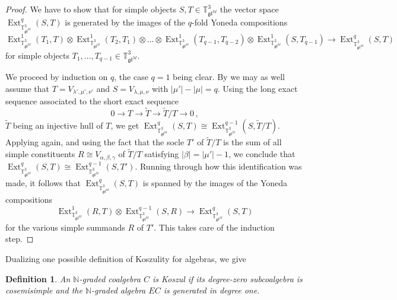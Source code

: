 \documentclass[11pt]{article}
\theoremstyle{plain}
\theoremstyle{nonumberplain}
\theoremstyle{plain}
\newtheorem{definition}[lemma]{Definition}
\theoremstyle{nonumberplain}
\newtheorem{proof}{Proof}
\newcommand\bN{{\mathbb N}}
\newcommand\bT{{\mathbb T}}
\newcommand\fgl{\mathfrak{gl}}
\DeclareMathOperator{\Ext}{\mathrm{Ext}}
\newcommand{\define}[1]{{\em #1}}
\begin{document}
\begin{proof}
We have to show that for simple objects $S,T\in \bT^3_{\fgl^M}$ the
vector space $\Ext_{\bT^3_{\fgl^M}}^q(S,T)$ is generated by the images of the $q$-fold Yoneda
compositions %
\begin{equation*}
	\Ext^1_{\bT^3_{\fgl^M}}\left(T_1,T\right)\otimes \Ext^1_{\bT^3_{\fgl^M}}\left(T_2,T_1\right)\otimes\ldots\otimes \Ext^1_{\bT^3_{\fgl^M}}\left(T_{q-1},T_{q-2}\right) \otimes \Ext^1_{\bT^3_{\fgl^M}}\left(S,T_{q-1}\right) \to \Ext^q_{\bT^3_{\fgl^M}}\left(S,T\right)
\end{equation*}
for simple objects $T_1,\ldots,T_{q-1}\in\bT^3_{\fgl^M}$.

We proceed by induction on $q$, the
case $q=1$ being clear.  By  we may as well assume that $T=V_{\lambda',\mu',\nu'}$ and $S=V_{\lambda,\mu,\nu}$ with $|\mu'|-|\mu|=q$. Using the long
exact sequence associated to the short exact sequence
\begin{equation*}
  0\to T\to \widetilde{T}\to \widetilde{T}/T\to 0\,,
\end{equation*}
$\widetilde{T}$ being an injective hull of $T$, we get $\Ext_{\bT^3_{\fgl^M}}^q(S,T)\cong
\Ext_{\bT^3_{\fgl^M}}^{q-1}(S,\widetilde{T}/T)$. Applying  again, and
using the fact that the socle $T'$ of $\widetilde{T}/T$ is the 
sum of all simple constituents $R\cong V_{\alpha,\beta,\gamma}$ of $\widetilde{T}/T$ satisfying
$|\beta|=|\mu'|-1$, we conclude that $\Ext_{\bT^3_{\fgl^M}}^q(S,T)\cong
\Ext_{\bT^3_{\fgl^M}}^{q-1}(S,T')$. Running through how this identification was made,
it follows that $\Ext_{\bT^3_{\fgl^M}}^q(S,T)$ is spanned by the images of the Yoneda compositions 
\begin{equation*}
  \Ext_{\bT^3_{\fgl^M}}^1(R,T)\otimes \Ext_{\bT^3_{\fgl^M}}^{q-1}(S,R)\to \Ext_{\bT^3_{\fgl^M}}^q(S,T)
\end{equation*}
for the various simple summands $R$ of $T'$. This takes care of the
induction step. 
\end{proof}



Dualizing one possible definition of Koszulity for algebras, we give 


\begin{definition}\label{def.Kosz_coalg}
An $\bN$-graded coalgebra $C$ is \define{Koszul} if its degree-zero
subcoalgebra is cosemisimple and the $\bN$-graded algebra $EC$ is generated in degree one.   
\end{definition}
\end{document}
